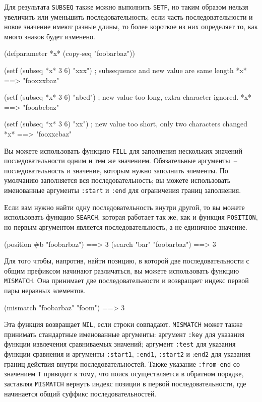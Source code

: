 Для результата \lstinline{SUBSEQ} также можно выполнить \lstinline{SETF}, но таким образом нельзя увеличить
или уменьшить последовательность; если часть последовательности и новое значение имеют
разные длины, то более короткое из них определяет то, как много знаков будет изменено.

\begin{myverb}
  (defparameter *x* (copy-seq "foobarbaz"))

  (setf (subseq *x* 3 6) "xxx")  ; subsequence and new value are same length
  *x* ==> "fooxxxbaz"

  (setf (subseq *x* 3 6) "abcd") ; new value too long, extra character ignored.
  *x* ==> "fooabcbaz"

  (setf (subseq *x* 3 6) "xx")   ; new value too short, only two characters changed
  *x* ==> "fooxxcbaz"
\end{myverb}

Вы можете использовать функцию \lstinline{FILL} для заполнения нескольких значений
последовательности одним и тем же значением.  Обязательные аргументы~--
последовательность и значение, которым нужно заполнить элементы.  По умолчанию
заполняется вся последовательность; вы можете использовать именованные аргументы
\lstinline{:start} и \lstinline{:end} для ограничения границ заполнения.

Если вам нужно найти одну последовательность внутри другой, то вы можете использовать
функцию \lstinline{SEARCH}, которая работает так же, как и функция \lstinline{POSITION}, но первым
аргументом является последовательность, а не единичное значение.

\begin{myverb}
  (position #\bslash{}b "foobarbaz") ==> 3
  (search "bar" "foobarbaz") ==> 3
\end{myverb}

Для того чтобы, напротив, найти позицию, в которой две последовательности с общим
префиксом начинают различаться, вы можете использовать функцию \lstinline{MISMATCH}.  Она
принимает две последовательности и возвращает индекс первой пары неравных элементов.

\begin{myverb}
  (mismatch "foobarbaz" "foom") ==> 3
\end{myverb}

Эта функция возвращает \lstinline{NIL}, если строки совпадают. \lstinline{MISMATCH} может также
принимать стандартные именованные аргументы: аргумент \lstinline{:key} для указания функции
извлечения сравниваемых значений; аргумент \lstinline{:test} для указания функции сравнения и
аргументы \lstinline{:start1}, \lstinline{:end1}, \lstinline{:start2} и :\lstinline{end2} для указания границ
действия внутри последовательностей.  Также указание \lstinline{:from-end} со значением
\lstinline{T} приводит к тому, что поиск осуществляется в обратном порядке, заставляя
\lstinline{MISMATCH} вернуть индекс позиции в первой последовательности, где начинается общий
суффикс последовательностей.

